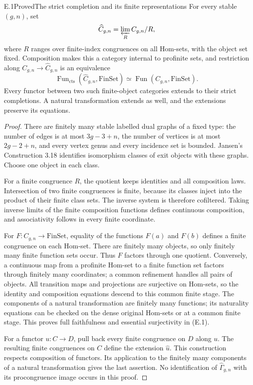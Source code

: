 \begin{result}{E.1}{Proved}{The strict completion and its finite representations}
For every stable $(g,n)$, set
\[
 \widehat C_{g,n}=\varprojlim_R C_{g,n}/R,
\]
where $R$ ranges over finite-index congruences on all Hom-sets, with the
object set fixed.  Composition makes this a category internal to
profinite sets, and restriction along $C_{g,n}\longrightarrow\widehat
C_{g,n}$ is an equivalence
\[
 \operatorname{Fun}_{\mathrm{cts}}(\widehat C_{g,n},\mathrm{FinSet})
       \simeq \operatorname{Fun}(C_{g,n},\mathrm{FinSet}).       \tag{E.1}
\]
Every functor between two such finite-object categories extends to their
strict completions.  A natural transformation extends as well, and the
extensions preserve its equations.
\end{result}
\begin{proof}
There are finitely many stable labelled dual graphs of a fixed type:
the number of edges is at most $3g-3+n$, the number of vertices is at
most $2g-2+n$, and every vertex genus and every incidence set is bounded.
Jansen's Construction 3.18 identifies isomorphism classes of exit objects
with these graphs.  Choose one object in each class.

For a finite congruence $R$, the quotient keeps identities and all
composition laws.  Intersection of two finite congruences is finite,
because its classes inject into the product of their finite class sets.
The inverse system is therefore cofiltered.  Taking inverse limits of
the finite composition functions defines continuous composition, and
associativity follows in every finite coordinate.

For $F:C_{g,n}\to\mathrm{FinSet}$, equality of the functions $F(a)$ and
$F(b)$ defines a finite congruence on each Hom-set.  There are finitely
many objects, so only finitely many finite function sets occur.  Thus
$F$ factors through one quotient.  Conversely, a continuous map from a
profinite Hom-set to a finite function set factors through finitely many
coordinates; a common refinement handles all pairs of objects.  All
transition maps and projections are surjective on Hom-sets, so the
identity and composition equations descend to this common finite stage.
The components of a natural transformation are finitely many functions;
its naturality equations can be checked on the dense original Hom-sets
or at a common finite stage.  This proves full faithfulness and essential
surjectivity in (E.1).

For a functor $u:C\to D$, pull back every finite congruence on $D$ along
$u$.  The resulting finite congruences on $C$ define the extension
$\widehat u$.  This construction respects composition of functors.
Its application to the finitely many components of a natural
transformation gives the last assertion.  No identification of
$\widehat\Gamma_{g,n}$ with its procongruence image occurs in this proof.
\end{proof}

